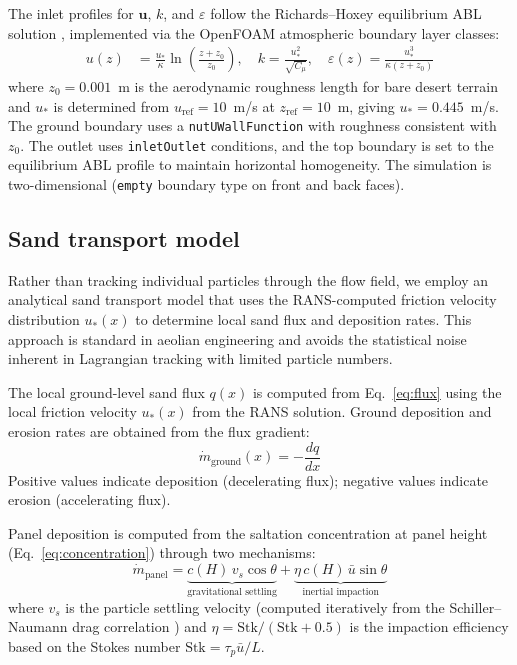 \documentclass[preprint,12pt,review]{elsarticle}
\begin{document}
The inlet profiles for $\mathbf{u}$, $k$, and $\varepsilon$ follow the Richards--Hoxey equilibrium ABL solution \cite{richards1993appropriate}, implemented via the OpenFOAM atmospheric boundary layer classes:
%
\begin{align}
  u(z) &= \frac{u_*}{\kappa} \ln\!\left(\frac{z + z_0}{z_0}\right), \quad
  k = \frac{u_*^2}{\sqrt{C_\mu}}, \quad
  \varepsilon(z) = \frac{u_*^3}{\kappa(z + z_0)}
  \label{eq:loglaw}
\end{align}
%
where $z_0 = 0.001$~m is the aerodynamic roughness length for bare desert terrain \cite{wieringa1992updating} and $u_*$ is determined from $u_\text{ref} = 10$~m/s at $z_\text{ref} = 10$~m, giving $u_* = 0.445$~m/s. The ground boundary uses a \texttt{nutUWallFunction} with roughness consistent with $z_0$. The outlet uses \texttt{inletOutlet} conditions, and the top boundary is set to the equilibrium ABL profile to maintain horizontal homogeneity. The simulation is two-dimensional (\texttt{empty} boundary type on front and back faces).

\subsection{Sand transport model}

Rather than tracking individual particles through the flow field, we employ an analytical sand transport model that uses the RANS-computed friction velocity distribution $u_*(x)$ to determine local sand flux and deposition rates. This approach is standard in aeolian engineering \cite{shao2008physics,zheng2009mechanics} and avoids the statistical noise inherent in Lagrangian tracking with limited particle numbers.

The local ground-level sand flux $q(x)$ is computed from Eq.~\eqref{eq:flux} using the local friction velocity $u_*(x)$ from the RANS solution. Ground deposition and erosion rates are obtained from the flux gradient:
%
\begin{equation}
  \dot{m}_\text{ground}(x) = -\frac{dq}{dx}
  \label{eq:ground_dep}
\end{equation}
%
Positive values indicate deposition (decelerating flux); negative values indicate erosion (accelerating flux).

Panel deposition is computed from the saltation concentration at panel height (Eq.~\ref{eq:concentration}) through two mechanisms:
%
\begin{equation}
  \dot{m}_\text{panel} = \underbrace{c(H)\,v_s \cos\theta}_\text{gravitational settling}
    + \underbrace{\eta\, c(H)\,\bar{u}\sin\theta}_\text{inertial impaction}
  \label{eq:panel_dep}
\end{equation}
%
where $v_s$ is the particle settling velocity (computed iteratively from the Schiller--Naumann drag correlation \cite{schiller1933drag}) and $\eta = \text{Stk}/(\text{Stk} + 0.5)$ is the impaction efficiency based on the Stokes number $\text{Stk} = \tau_p \bar{u}/L$.
\end{document}
